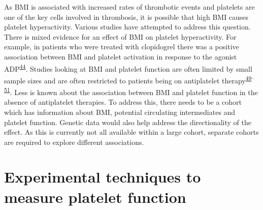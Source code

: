 \documentclass[11pt,twoside]{bristolthesis}
\begin{document}
As BMI is associated with increased rates of thrombotic events and platelets are one of the key cells involved in thrombosis, it is possible that high BMI causes platelet hyperactivity. Various studies have attempted to address this question. There is mixed evidence for an effect of BMI on platelet hyperactivity. For example, in patients who were treated with clopidogrel there was a positive association between BMI and platelet activation in response to the agonist ADP\textsuperscript{\protect\hyperlink{ref-Nardin2015}{44}}. Studies looking at BMI and platelet function are often limited by small sample sizes and are often restricted to patients being on antiplatelet therapy\textsuperscript{\protect\hyperlink{ref-Deharo2014}{49}--\protect\hyperlink{ref-Pankert2014}{51}}. Less is known about the association between BMI and platelet function in the absence of antiplatelet therapies. To address this, there needs to be a cohort which has information about BMI, potential circulating intermediates and platelet function. Genetic data would also help address the directionality of the effect. As this is currently not all available within a large cohort, separate cohorts are required to explore different associations.

\hypertarget{platelet-function-techniques}{%
\section{Experimental techniques to measure platelet function}\label{platelet-function-techniques}}
\end{document}
